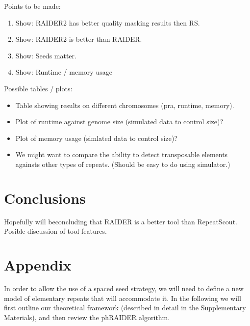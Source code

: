 \documentclass{bmcart}
\newcommand{\red}[1]{{\color{red}#1}}
\begin{document}
\red{
Points to be made:
\begin{enumerate}
\item Show: RAIDER2 has better quality masking results then RS.
\item Show: RAIDER2 is better than RAIDER.
\item Show: Seeds matter.
\item Show: Runtime / memory usage
\end{enumerate}


Possible tables / plots:
\begin{itemize}
\item Table showing results on different chromosomes (pra, runtime, memory).
\item Plot of runtime against genome size (simulated data to control size)?
\item Plot of memory usage (simlated data to control size)?
\item We might want to compare the ability to detect transposable
  elements againsts other types of repeats.  (Should be easy to do
  using simulator.)
\end{itemize}
}

\section*{Conclusions}

\red {
Hopefully will beconcluding that RAIDER is a better tool than
RepeatScout.  Posible discussion of tool features.
}

\section*{Appendix}
In order to allow the use of a spaced seed strategy, we will need to
define a new model of elementary repeats that will accommodate it.  In
the following we will first outline our theoretical framework
(described in detail in the Supplementary Materials), and then review
the phRAIDER algorithm.
\end{document}
